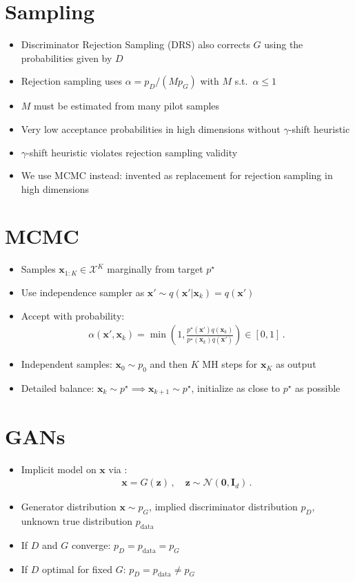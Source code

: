 \documentclass[a0,landscape]{a0poster}
\newcommand{\mysection}[1]{\section*{\fontsize{67.1}{82} \selectfont \color{NavyBlue} #1 \color{Black}}}
\renewcommand{\vec}[1]{{\boldsymbol{\mathbf{#1}}}} %
\newcommand{\R}{\mathbb{R}}
\newcommand{\set}[1]{\mathcal{#1}}
\newcommand{\sample}{\sim}
\newcommand{\given}{|}
\newcommand{\norm}{\mathcal{N}}
\newcommand{\target}{{p^\star}}
\newcommand{\prop}{q}
\newcommand{\pinit}{{p_0}}
\newcommand{\PG}{{p_G}}
\newcommand{\PD}{{p_D}}
\newcommand{\PR}{{p_{\textrm{data}}}}
\newcommand{\accept}{\alpha}
\newcommand{\setx}{\set{X}}
\begin{document}
\begin{multicols}{3}
\mysection{Sampling}

\begin{itemize}
  \item Discriminator Rejection Sampling (DRS) also corrects $G$ using the probabilities given by $D$
  \item Rejection sampling uses $\accept = p_D/(Mp_G)$ with $M$ s.t.~$\alpha \leq 1$
  \item $M$ must be estimated from many pilot samples
  \item Very low acceptance probabilities in high dimensions without $\gamma$-shift heuristic
  \item $\gamma$-shift heuristic violates rejection sampling validity
  \item We use MCMC instead: invented as replacement for rejection sampling in high dimensions
\end{itemize}

\mysection{MCMC}

\begin{itemize}
  \item Samples $\vec x_{1:K} \in \setx^K$ marginally from target $\target$
  \item Use independence sampler as $\vec x' \sample \prop(\vec x' \given \vec x_k)=\prop(\vec x')$
  \item Accept with probability:
  \begin{align}
    \accept(\vec x', \vec x_k) = \min\left(1, \frac{\target(\vec x')\prop(\vec x_k)}{\target(\vec x_k)\prop(\vec x')}\right) \in [0,1]\,. \label{eq:alpha def}
  \end{align}
  \item Independent samples: $\vec x_0 \sample \pinit$ and then $K$ MH steps for $\vec x_K$ as output
  \item Detailed balance: $\vec x_k \sample \target \implies \vec x_{k+1} \sample \target$, initialize as close to $\target$ as possible
\end{itemize}

\mysection{GANs}

\begin{itemize}
  \item Implicit model on $\vec x$ via \smash{$G \in \R^{d} \rightarrow \setx$}:
  \begin{align}
    \vec x = G(\vec z)\,, \quad \vec z \sample \norm(\vec 0, \vec I_{d})\,.
  \end{align}
  \item Generator distribution $\vec x \sample \PG$, implied discriminator distribution $\PD$, unknown true distribution $\PR$
  \item If $D$ and $G$ converge: $\PD = \PR = \PG$
  \item If $D$ optimal for fixed $G$: $\PD = \PR \neq \PG$
\end{itemize}


\end{multicols}
\end{document}
